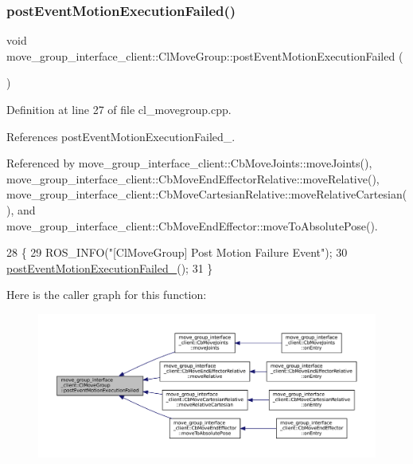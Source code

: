 \subsubsection{\texorpdfstring{post\+Event\+Motion\+Execution\+Failed()}{postEventMotionExecutionFailed()}}
{\footnotesize\ttfamily void move\+\_\+group\+\_\+interface\+\_\+client\+::\+Cl\+Move\+Group\+::post\+Event\+Motion\+Execution\+Failed (\begin{DoxyParamCaption}{ }\end{DoxyParamCaption})}



Definition at line 27 of file cl\+\_\+movegroup.\+cpp.



References post\+Event\+Motion\+Execution\+Failed\+\_\+.



Referenced by move\+\_\+group\+\_\+interface\+\_\+client\+::\+Cb\+Move\+Joints\+::move\+Joints(), move\+\_\+group\+\_\+interface\+\_\+client\+::\+Cb\+Move\+End\+Effector\+Relative\+::move\+Relative(), move\+\_\+group\+\_\+interface\+\_\+client\+::\+Cb\+Move\+Cartesian\+Relative\+::move\+Relative\+Cartesian(), and move\+\_\+group\+\_\+interface\+\_\+client\+::\+Cb\+Move\+End\+Effector\+::move\+To\+Absolute\+Pose().


\begin{DoxyCode}
28 \{
29     ROS\_INFO(\textcolor{stringliteral}{"[ClMoveGroup] Post Motion Failure Event"});
30     \hyperlink{classmove__group__interface__client_1_1ClMoveGroup_a261f73d036417b5374d08a1e89325eed}{postEventMotionExecutionFailed\_}();
31 \}
\end{DoxyCode}
Here is the caller graph for this function\+:
\nopagebreak
\begin{figure}[H]
\begin{center}
\leavevmode
\includegraphics[width=350pt]{classmove__group__interface__client_1_1ClMoveGroup_a41c0eebdb446e6fbdd17113524c34869_icgraph}
\end{center}
\end{figure}
\mbox{\label{classmove__group__interface__client_1_1ClMoveGroup_a1b617e0018790b8ebf23aea75eb7acba}} 
